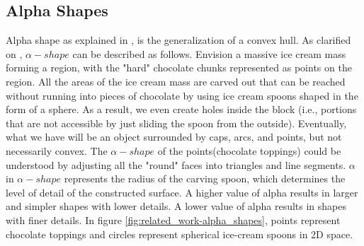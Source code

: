 \subsection{Alpha Shapes}
Alpha shape as explained in \parencite{edelsbrunner1983shape}, is the generalization of a convex hull. As clarified on \parencite{alpha_shapes_stanford}, \(\alpha-shape\) can be described as follows. Envision a massive ice cream mass forming a region, with the "hard" chocolate chunks represented as points on the region. All the areas of the ice cream mass are carved out that can be reached without running into pieces of chocolate by using ice cream spoons shaped in the form of a sphere. As a result, we even create holes inside the block (i.e., portions that are not accessible by just sliding the spoon from the outside). Eventually, what we have will be an object surrounded by caps, arcs, and points, but not necessarily convex.  The \(\alpha-shape\) of the points(chocolate toppings) could be understood by adjusting all the  "round" faces into triangles and line segments. \(\alpha\) in \(\alpha-shape\) represents the radius of the carving spoon, which determines the level of detail of the constructed surface. A higher value of alpha results in larger and simpler shapes with lower details. A lower value of alpha results in shapes with finer details. In figure \ref{fig:related_work-alpha_shapes}, points represent chocolate toppings and circles represent spherical ice-cream spoons in 2D space.

